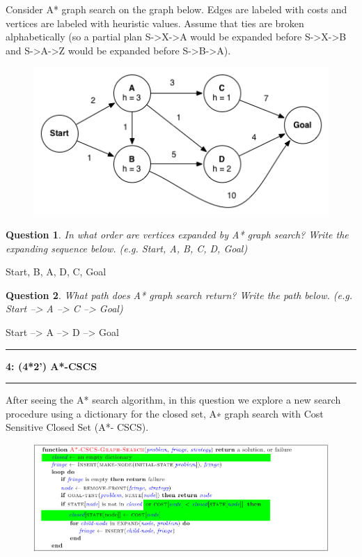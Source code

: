 \documentclass[10.5pt]{article}
\newcommand\question[2]{\vspace{.25in}\hrule\textbf{#1: #2}\vspace{.5em}\hrule\vspace{.10in}}
\newtheorem{Q}{Question}
\begin{document}
Consider A* graph search on the graph below. Edges are labeled with costs and vertices are labeled with heuristic values. Assume that ties are broken alphabetically (so a partial plan S->X->A would be expanded before S->X->B and S->A->Z would be expanded before S->B->A).
\begin{figure}[htbp]
	\centerline{\includegraphics[scale=0.66]{a_star_graph.png}}
	\label{fig3}
\end{figure}

\begin{Q}
	In what order are vertices expanded by A* graph search? Write the expanding sequence below. (e.g. Start, A, B, C, D, Goal)\\
\end{Q}
Start, B, A, D, C, Goal\\
\begin{Q}
	What path does A* graph search return? Write the path below. (e.g. Start --> A --> C --> Goal)
\end{Q}

Start --> A --> D --> Goal\\


\newpage

\question{4}{(4*2') A*-CSCS}
After seeing the A* search algorithm, in this question we explore a new search procedure using a dictionary for the closed set, A∗ graph search with Cost Sensitive Closed Set (A*- CSCS).

\begin{figure}[htbp]
	\centerline{\includegraphics[scale=0.45]{a-star-cscs.png}}
	\label{fig2}
\end{figure}
\end{document}
